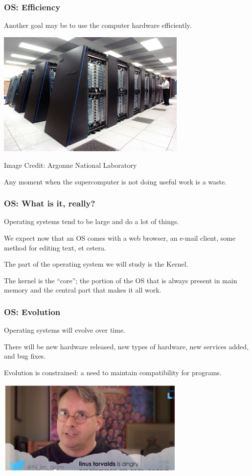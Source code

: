 \begin{frame}
\frametitle{OS: Efficiency}
Another goal may be to use the computer hardware efficiently.

\begin{center}
	\includegraphics[width=0.7\textwidth]{images/supercomputer.jpg}
\end{center}
\hfill Image Credit: Argonne National Laboratory

Any moment when the supercomputer is not doing useful work is a waste.

\end{frame}

\begin{frame}
\frametitle{OS: What is it, really?}

Operating systems tend to be large and do a lot of things. 

We expect now that an OS comes with a web browser, an e-mail client, some method for editing text, et cetera. 

The part of the operating system we will study is the \alert{Kernel}.

The kernel is the ``core''; the portion of the OS that is always present in main memory and the central part that makes it all work.

\end{frame}

\begin{frame}
\frametitle{OS: Evolution}
Operating systems will evolve over time. 

There will be new hardware released, new types of hardware, new services added, and bug fixes. 

Evolution is constrained: a need to maintain compatibility for programs. 

\begin{center}
	\includegraphics[width=0.7\textwidth]{images/linus-angry.jpg}
\end{center}

\end{frame}


